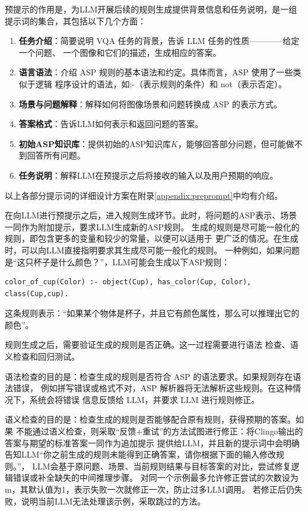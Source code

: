 预提示的作用是，为LLM开展后续的规则生成提供背景信息和任务说明，是一组提示词的集合，其包括以下几个方面：
\begin{enumerate}[nosep]
\item \textbf{任务介绍}：简要说明 VQA 任务的背景，告诉 LLM 任务的性质————给定一个问题、
一个图像和它们的描述，生成相应的答案。
\item \textbf{语言语法}：介绍 ASP 规则的基本语法和约定。具体而言，ASP 使用了一些类似于逻辑
程序设计的语法，如:-（表示规则的条件）和 not（表示否定）。
\item \textbf{场景与问题解释}：解释如何将图像场景和问题转换成 ASP 的表示方式。
\item \textbf{答案格式}：告诉LLM如何表示和返回问题的答案。
\item \textbf{初始ASP知识库}：提供初始的ASP知识库$K$，能够回答部分问题，但可能做不到回答所有问题。
\item \textbf{任务说明}：解释LLM在预提示之后将接收的输入以及用户预期的响应。
\end{enumerate}
以上各部分提示词的详细设计方案在附录\ref{appendix:preprompt}中均有介绍。

在向LLM进行预提示之后，进入规则生成环节。此时，将问题的ASP表示、场景一同作为附加提示，要求LLM生成新的ASP规则。
生成的规则是尽可能一般化的规则，即包含更多的变量和较少的常量，以便可以适用于
更广泛的情况。在生成时，可以向LLM直接指明要求其生成尽可能一般化的规则。
一种例如，如果问题是“这只杯子是什么颜色？”，LLM可能会生成以下ASP规则：
\begin{lstlisting}
color_of_cup(Color) :- object(Cup), has_color(Cup, Color), class(Cup,cup).
\end{lstlisting}
这条规则表示：“如果某个物体是杯子，并且它有颜色属性，那么可以推理出它的颜色”。

规则生成之后，需要验证生成的规则是否正确。这一过程需要进行语法
检查、语义检查和回归测试。

语法检查的目的是：检查生成的规则是否符合 ASP 的语法要求。如果规则存在语法错误，
例如拼写错误或格式不对，ASP 解析器将无法解析这些规则。在这种情况下，系统会将错误
信息反馈给 LLM，并要求 LLM 进行规则修正。

语义检查的目的是：检查生成的规则是否能够配合原有规则，获得预期的答案。如果
不能通过语义检查，则采取“反馈+重试”的方法试图进行修正：将Clingo输出的答案与期望的标准答案一同作为追加提示
提供给LLM，并且新的提示词中会明确告知LLM“你之前生成的规则未能得到正确答案，请你根据下面的输入修改规则。”，
LLM会基于原问题、场景、当前规则结果与目标答案的对比，尝试修复逻辑错误或补全缺失的中间推理步骤。
对同一个示例最多允许修正尝试的次数设为m，其默认值为1，表示失败一次就修正一次，防止过多LLM调用。
若修正后仍失败，说明当前LLM无法处理该示例，采取跳过的方法。

